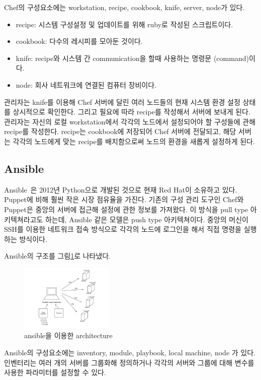 \documentclass{pnu-survey}
\begin{document}
Chef의 구성요소에는 workstation, recipe, cookbook, knife, server, node가 있다.  
\begin{itemize}[itemsep=0pt,parsep=0pt]
    \item recipe: 시스템 구성설정 및 업데이트를 위해 ruby로 작성된 스크립트이다.
    \item cookbook: 다수의 레시피를 모아둔 것이다.
    \item knife: recipe와 시스템 간 communication을 할때 사용하는 명령문 (command)이다.
    \item node: 회사 네트워크에 연결된 컴퓨터 장비이다.
\end{itemize}
관리자는 knife를 이용해 Chef 서버에 달린 여러 노드들의 현재 시스템 환경 설정 상태를 상시적으로 확인한다. 그리고 필요에 따라 recipe를 작성해서 서버에 보내게 된다. 관리자는 자신의 로컬 workstation에서 각각의 노드에서 설정되어야 할 구성들에 관해 recipe를 작성한다. recipe는 cookbook에 저장되어 Chef 서버에 전달되고, 해당 서버는 각각의 노드에게 맞는 recipe를 배치함으로써 노드의 환경을 새롭게 설정하게 된다. 

\subsection{Ansible}
Ansible~\cite{ansible}은 2012년 Python으로 개발된 것으로 현재 Red Hat이 소유하고 있다. Puppet에 비해 훨씬 작은 시장 점유율을 가진다.
기존의 구성 관리 도구인 Chef와 Puppet은 중앙의 서버에 접근해 설정에 관한 정보를 가져왔다. 이 방식을 pull type 아키텍쳐라고도 하는데, Ansible 같은 모델은 push type 아키텍쳐이다. 중앙의 머신이 SSH를 이용한 네트워크 접속 방식으로 각각의 노드에 로그인을 해서 직접 명령을 실행하는 방식이다. 

Ansible의 구조를 그림\ref{fig:ansible}로 나타냈다. 
\begin{figure}[!ht]
\centering
\includegraphics[width=0.4\textwidth]{img/ansible.jpg}
\caption{ansible을 이용한 architecture}
\label{fig:ansible}
\end{figure}

Ansible의 구성요소에는 inventory, module, playbook, local machine, node 가 있다.  
인벤터리는 여러 개의 서버를 그룹화해 정의하거나 각각의 서버와 그룹에 대해 변수를 사용한 파라미터를 설정할 수 있다.
\end{document}
